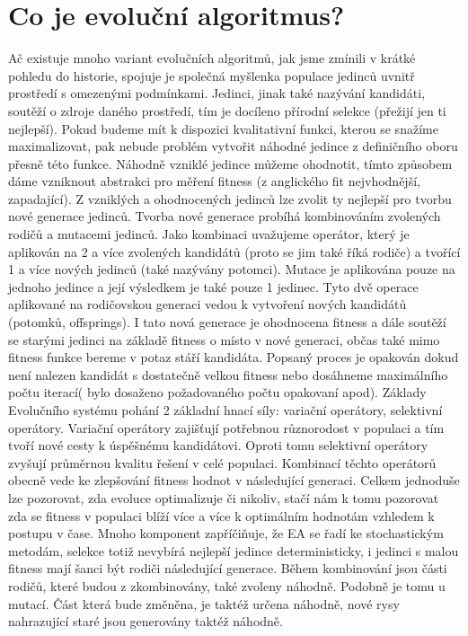 \section{Co je evoluční algoritmus?}
Ač existuje mnoho variant evolučních algoritmů, jak jsme zmínili v krátké pohledu do historie, spojuje je společná myšlenka populace jedinců uvnitř prostředí s omezenými podmínkami. Jedinci, jinak také nazývání kandidáti, soutěží o zdroje daného prostředí, tím je docíleno přírodní selekce (přežijí jen ti nejlepší). Pokud budeme mít k dispozici kvalitativní funkci, kterou se snažíme maximalizovat, pak nebude problém vytvořit náhodné jedince z definičního oboru přesně této funkce. Náhodně vzniklé jedince můžeme ohodnotit, tímto způsobem dáme vzniknout abstrakci pro měření fitness (z anglického fit nejvhodnější, zapadající). Z vzniklých a ohodnocených jedinců lze zvolit ty nejlepší pro tvorbu nové generace jedinců. Tvorba nové generace probíhá kombinováním zvolených rodičů a mutacemi jedinců. Jako kombinaci uvažujeme operátor, který je aplikován na 2 a více zvolených kandidátů (proto se jim také říká rodiče) a tvořící 1 a více nových jedinců (také nazývány potomci). Mutace je aplikována pouze na jednoho jedince a její výsledkem je také pouze 1 jedinec. Tyto dvě operace aplikované na rodičovskou generaci vedou k vytvoření nových kandidátů (potomků, offsprings). I tato nová generace je ohodnocena fitness a dále soutěží se starými jedinci na základě fitness o místo v nové generaci, občas také mimo fitness funkce bereme v potaz stáří kandidáta. Popsaný proces je opakován dokud není nalezen kandidát s dostatečně velkou fitness nebo dosáhneme maximálního počtu iterací( bylo dosaženo požadovaného počtu opakovaní apod). Základy Evolučního systému pohání 2 základní hnací síly: variační operátory, selektivní operátory. Variační operátory zajišťují potřebnou různorodost v populaci a tím tvoří nové cesty k úspěšnému kandidátovi. Oproti tomu selektivní operátory zvyšují průměrnou kvalitu řešení v celé populaci. Kombinací těchto operátorů obecně vede ke zlepšování fitness hodnot v následující generaci. Celkem jednoduše lze pozorovat, zda evoluce optimalizuje či nikoliv, stačí nám k tomu pozorovat zda se fitness v populaci blíží více a více k optimálním hodnotám vzhledem k postupu v čase. Mnoho komponent zapříčiňuje, že EA se řadí ke stochastickým metodám, selekce totiž nevybírá nejlepší jedince deterministicky, i jedinci s malou fitness mají šanci být rodiči následující generace. Během kombinování jsou části rodičů, které budou z zkombinovány, také zvoleny náhodně. Podobně je tomu u mutací. Část která bude změněna, je taktéž určena náhodně, nové rysy nahrazující staré jsou generovány taktéž náhodně.  
